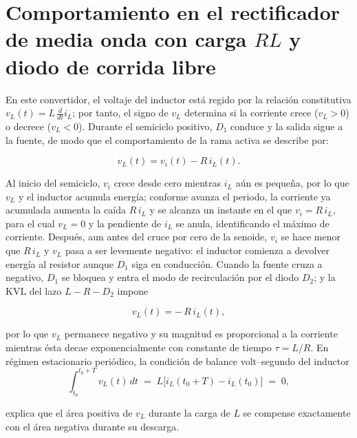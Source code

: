 \documentclass[conference]{IEEEtran}
\begin{document}
\section{Comportamiento en el rectificador de media onda con carga $RL$ y diodo de corrida libre}
En este convertidor, el voltaje del inductor está regido por la relación constitutiva $v_L(t)=L\,\tfrac{d}{dt}i_L$; por tanto, el signo de $v_L$ determina si la corriente crece ($v_L>0$) o decrece ($v_L<0$). Durante el semiciclo positivo, $D_1$ conduce y la salida sigue a la fuente, de modo que el comportamiento de la rama activa se describe por:

\begin{equation*}
	v_L(t)=v_i(t)-R\,i_L(t).
\end{equation*}

Al inicio del semiciclo, $v_i$ crece desde cero mientras $i_L$ aún es pequeña, por lo que $v_L$ y el inductor acumula energía; conforme avanza el periodo, la corriente ya acumulada aumenta la caída $R\,i_L$ y se alcanza un instante en el que $v_i=R\,i_L$, para el cual $v_L=0$ y la pendiente de $i_L$ se anula, identificando el máximo de corriente. Después, aun antes del cruce por cero de la senoide, $v_i$ se hace menor que $R\,i_L$ y $v_L$ pasa a ser levemente negativo: el inductor comienza a devolver energía al resistor aunque $D_1$ siga en conducción. Cuando la fuente cruza a negativo, $D_1$ se bloquea y entra el modo de recirculación por el diodo $D_2$; y la KVL del lazo $L\!-\!R\!-\!D_2$ impone

\begin{equation*}
	v_L(t)=-\,R\,i_L(t),
\end{equation*}

por lo que $v_L$ permanece negativo y su magnitud es proporcional a la corriente mientras ésta decae exponencialmente con constante de tiempo $\tau=L/R$. En régimen estacionario periódico, la condición de balance volt–segundo del inductor
\begin{equation*}
	\int_{t_0}^{t_0+T} v_L(t)\,dt \;=\; L\big[i_L(t_0+T)-i_L(t_0)\big]\;=\;0,
\end{equation*}

explica que el área positiva de $v_L$ durante la carga de $L$ se compense exactamente con el área negativa durante su descarga.
\end{document}
